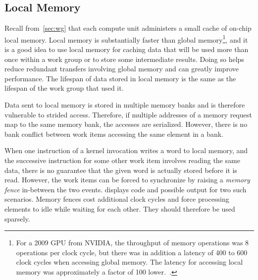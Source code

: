 \documentclass[11pt,twoside]{report}
\begin{document}
\subsection{Local Memory}
Recall from~\cref{sec:wg} that each compute unit administers a small cache of on-chip local memory.  Local memory is substantially faster than global memory\footnote{For a 2009 GPU from NVIDIA, the throughput of memory operations was 8 operations per clock cycle, but there was in addition a latency of 400 to 600 clock cycles when accessing global memory. The latency for accessing local memory was approximately a factor of 100 lower.~\cite{opencl.best.practices}.}, and it is a good idea to use local memory for caching data that will be used more than once within a work group or to store some intermediate results. Doing so helps reduce redundant transfers involving global memory and can greatly improve performance.  The lifespan of data stored in local memory is the same as the lifespan of the work group that used it.

\indent Data sent to local memory is stored in multiple memory banks and is therefore vulnerable to strided access.  Therefore, if multiple addresses of a memory request map to the same memory bank, the accesses are serialized. However, there is no bank conflict between work items accessing the same element in a bank.

\indent When one instruction of a kernel invocation writes a word to local memory, and the successive instruction for some other work item involves reading the same data, there is no guarantee that the given word is actually stored before it is read. However, the work items can be forced to synchronize by raising a {\it memory fence} in-between the two events.  displays code and possible output for two such scenarios. Memory fences cost additional clock cycles and force processing elements to idle while waiting for each other. They should therefore be used sparsely. 
\end{document}
